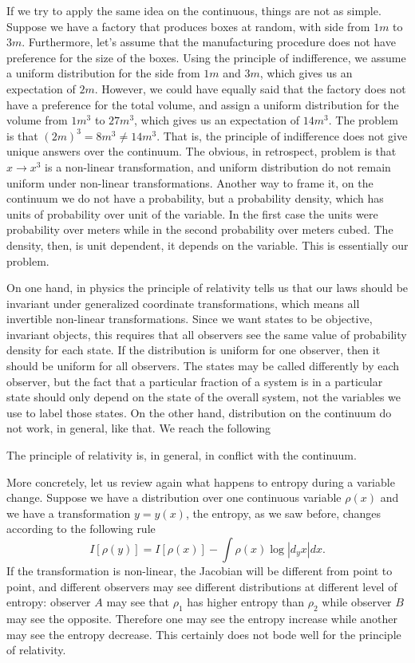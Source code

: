 If we try to apply the same idea on the continuous, things are not as simple. Suppose we have a factory that produces boxes at random, with side from $1m$ to $3m$. Furthermore, let's assume that the manufacturing procedure does not have preference for the size of the boxes. Using the principle of indifference, we assume a uniform distribution for the side from $1m$ and $3m$, which gives us an expectation of $2m$. However, we could have equally said that the factory does not have a preference for the total volume, and assign a uniform distribution for the volume from $1m^3$ to $27 m^3$, which gives us an expectation of $14 m^3$. The problem is that $(2m)^3 = 8 m^3 \neq 14 m^3$. That is, the principle of indifference does not give unique answers over the continuum. The obvious, in retrospect, problem is that $x \to x^3$ is a non-linear transformation, and uniform distribution do not remain uniform under non-linear transformations. Another way to frame it, on the continuum we do not have a probability, but a probability density, which has units of probability over unit of the variable. In the first case the units were probability over meters while in the second probability over meters cubed. The density, then, is unit dependent, it depends on the variable. This is essentially our problem.

On one hand, in physics the principle of relativity tells us that our laws should be invariant under generalized coordinate transformations, which means all invertible non-linear transformations. Since we want states to be objective, invariant objects, this requires that all observers see the same value of probability density for each state. If the distribution is uniform for one observer, then it should be uniform for all observers. The states may be called differently by each observer, but the fact that a particular fraction of a system is in a particular state should only depend on the state of the overall system, not the variables we use to label those states. On the other hand, distribution on the continuum do not work, in general, like that. We reach the following
\begin{insight}
	The principle of relativity is, in general, in conflict with the continuum.
\end{insight}

More concretely, let us review again what happens to entropy during a variable change. Suppose we have a distribution over one continuous variable $\rho(x)$ and we have a transformation $y = y(x)$, the entropy, as we saw before, changes according to the following rule
\begin{equation}
	I[\rho(y)] = I[\rho(x)] - \int \rho(x)\log|d_y x| dx.
\end{equation}
If the transformation is non-linear, the Jacobian will be different from point to point, and different observers may see different distributions at different level of entropy: observer $A$ may see that $\rho_1$ has higher entropy than $\rho_2$ while observer $B$ may see the opposite. Therefore one may see the entropy increase while another may see the entropy decrease. This certainly does not bode well for the principle of relativity.

